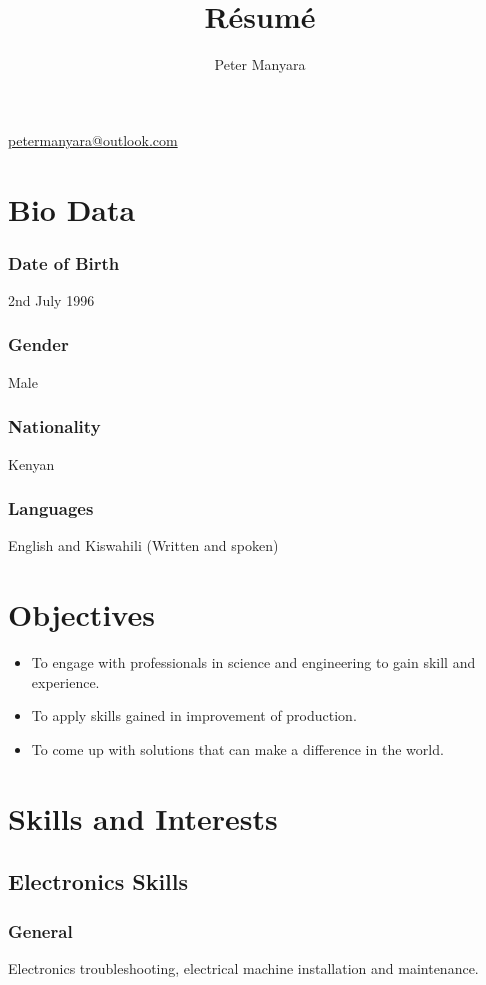 \documentclass[a4paper]{article}
\title{R\'esum\'e}
\author{Peter Manyara}
\makeatletter
\renewcommand{\maketitle}
{
	\begin{center}
		{\huge\bfseries
		\theauthor}
	
		\vspace{.2cm}
		\href{mailto:petermanyara@outlook.com}{\ttfamily\color{blue!80!black!90}petermanyara@outlook.com}
	\end{center}
	
}
\makeatother
\begin{document}
\maketitle
\section{Bio Data}
\subsubsection{Date of Birth}
2nd July 1996
\subsubsection{Gender}
Male
\subsubsection{Nationality}
Kenyan
\subsubsection{Languages}
English and Kiswahili (Written and spoken)

\section{Objectives}
\begin{itemize}
	\item To engage with professionals in science and engineering to gain skill and experience.
	\item To apply skills gained in improvement of production.
	\item To come up with solutions that can make a difference in the world. 
\end{itemize}

\section{Skills and Interests}
\subsection{Electronics Skills}
\subsubsection{General}
Electronics troubleshooting, electrical machine installation and maintenance.
\end{document}
